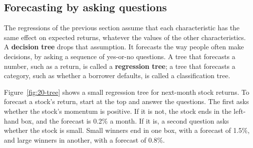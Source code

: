 \subsection{Forecasting by asking questions}

The regressions of the previous section assume that each characteristic has the same effect on expected returns, whatever the values of the other characteristics. A \textbf{decision tree} drops that assumption. It forecasts the way people often make decisions, by asking a sequence of yes-or-no questions. A tree that forecasts a number, such as a return, is called a \textbf{regression tree}; a tree that forecasts a category, such as whether a borrower defaults, is called a classification tree.

Figure~\ref{fig:20-tree} shows a small regression tree for next-month stock returns. To forecast a stock's return, start at the top and answer the questions. The first asks whether the stock's momentum is positive. If it is not, the stock ends in the left-hand box, and the forecast is 0.2\% a month. If it is, a second question asks whether the stock is small. Small winners end in one box, with a forecast of 1.5\%, and large winners in another, with a forecast of 0.8\%.


